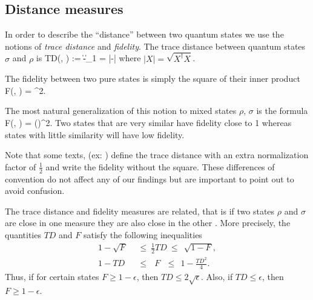 \documentclass[aps,11pt,twoside,letterpaper]{article}
\theoremstyle{plain}
\theoremstyle{definition}
\begin{document}
			
						
			

		\bigskip		
		\subsection{Distance measures}		\label{subsection:distance-measures}


			In order to describe the ``distance'' between two quantum states we use the notions of 
			\emph{trace distance} and \emph{fidelity}.
		    The trace distance between quantum states $\sigma$ and $\rho$ is
			\be
				TD(\rho, \sigma) 	:= \|\rho-\sigma\|_1 = |\rho-\sigma|
			\ee
			where  $|X| = \sqrt{X^{\dagger}X}$.
			
			The fidelity between two pure states is simply the square of their inner product
			\be
				F(\ket{\varphi}, \ket{\psi}) = \left\vert \braket{\varphi}{\psi} \right\vert^2.
			\ee
			
			The most natural generalization of this notion to mixed states $\rho$, $\sigma$ is
			the formula
	    	\be
	    		F(\rho, \sigma) = \left(\sqrt{\sqrt{\rho}\sigma\sqrt{\rho}}\right)^2.
	    	\ee
		    Two states that are very similar have fidelity close to 1 whereas states with little similarity 
		    will have low fidelity.
		    
		    Note that some texts, (ex: \cite{NC04}) define the trace distance with an extra normalization factor
			of $\tfrac{1}{2}$ and write the fidelity without the square. These differences of convention 
			do not affect any of our findings but are important to point out to avoid confusion.
		
			
			The trace distance and fidelity measures are related, that is if two states $\rho$ and $\sigma$
			are close in one measure they are also close in the other \cite{Fuchs}. 
			More precisely, the quantities $TD$ and $F$ satisfy the following inequalities
			\begin{align}
				1-\sqrt{F} \ \	&\leq \ \tfrac{1}{2}TD 	\ \leq \ \ \sqrt{1-F},	\\
				1 - TD	   \ \ 	&\leq \ \ \ F 	\ \  	\ \leq \ \ 1 - \tfrac{TD^2}{4}.
			\end{align}
			Thus, if for certain states $F \geq 1-\epsilon$, then $TD \leq 2\sqrt{\epsilon}$. 
			Also, if $TD \leq \epsilon$, then $F \geq 1 - \epsilon$.
			
\end{document}
